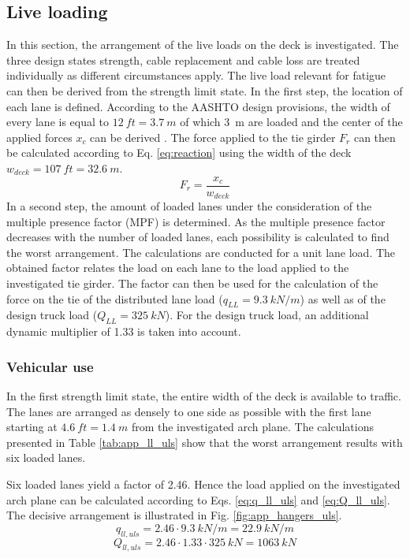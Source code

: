 \subsection{Live loading} \label{Appendix_Liveloading}
In this section, the arrangement of the live loads on the deck is investigated. The three design states strength, cable replacement and cable loss are treated individually as different circumstances apply. The live load relevant for fatigue can then be derived from the strength limit state. In the first step, the location of each lane is defined. According to the AASHTO design provisions, the width of every lane is equal to $\SI{12}{ft} = \SI{3.7}{m}$ of which \SI{3}{m} are loaded and the center of the applied forces $x_c$ can be derived \cite{AASHTO}. The force applied to the tie girder $F_r$ can then be calculated according to Eq. \ref{eq:reaction} using the width of the deck $w_{deck}=\SI{107}{ft}=\SI{32.6}{m}$.
\begin{equation}
    F_r = \frac{x_c}{w_{deck}}
    \label{eq:reaction}
\end{equation}
In a second step, the amount of loaded lanes under the consideration of the multiple presence factor (MPF) is determined. As the multiple presence factor decreases with the number of loaded lanes, each possibility is calculated to find the worst arrangement. The calculations are conducted for a unit lane load. The obtained factor relates the load on each lane to the load applied to the investigated tie girder. The factor can then be used for the calculation of the force on the tie of the distributed lane load ($q_{LL}=\SI{9.3}{kN/m}$) as well as of the design truck load ($Q_{LL}=\SI{325}{kN}$). For the design truck load, an additional dynamic multiplier of 1.33 is taken into account. 

\subsubsection*{Vehicular use} \label{Appendx_A_Live_loading_1}
In the first strength limit state, the entire width of the deck is available to traffic. The lanes are arranged as densely to one side as possible with the first lane starting at $\SI{4.6}{ft}=\SI{1.4}{m}$ from the investigated arch plane. The calculations presented in Table \ref{tab:app_ll_uls} show that the worst arrangement results with six loaded lanes. 



Six loaded lanes yield a factor of 2.46. Hence the load applied on the investigated arch plane can be calculated according to Eqs. \eqref{eq:q_ll_uls} and \eqref{eq:Q_ll_uls}. The decisive arrangement is illustrated in Fig. \ref{fig:app_hangers_uls}.
\begin{equation}
    q_{ll, uls} = 2.46 \cdot \SI{9.3}{kN/m} = \SI{22.9}{kN/m}
    \label{eq:q_ll_uls}
\end{equation}
\begin{equation}
    Q_{ll, uls} = 2.46 \cdot 1.33 \cdot \SI{325}{kN} = \SI{1063}{kN}
    \label{eq:Q_ll_uls}
\end{equation}

